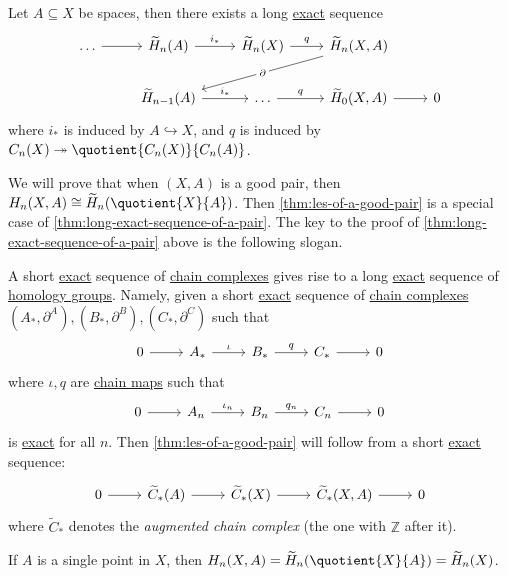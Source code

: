 \begin{theorem}\label{thm:long-exact-sequence-of-a-pair}
	Let \(A \subseteq X\) be spaces, then there exists a long \hyperref[def:exact]{exact} sequence
	\[
		\begin{tikzcd}
			{\ldots} & {\widetilde{H}_n(A)} & {\widetilde{H}_n(X)} & {\widetilde{H}_n(X, A)} \\
			& {\widetilde{H}_{n-1}(A)} & \ldots & {\widetilde{H}_{0}(X, A)} & 0
			\arrow[from=1-1, to=1-2]
			\arrow["{i_\ast}", from=1-2, to=1-3]
			\arrow["q", from=1-3, to=1-4]
			\arrow[from=2-4, to=2-5]
			\arrow["{q}", from=2-3, to=2-4]
			\arrow["{i_\ast}", from=2-2, to=2-3]
			\arrow["{\partial}"{description}, from=1-4, to=2-2]
		\end{tikzcd}
	\]
	where \(i_\ast\) is induced by \(A\hookrightarrow X\), and \(q\) is induced by \(C_{n} (X)\twoheadrightarrow \quotient{C_{n} (X)}{C_{n} (A)}\).
\end{theorem}
We will prove that when \((X, A)\) is a good pair, then \(H_n(X, A) \cong \widetilde{H}_n(\quotient{X}{A})\). Then \autoref{thm:les-of-a-good-pair}
is a special case of \autoref{thm:long-exact-sequence-of-a-pair}. The key to the proof of \autoref{thm:long-exact-sequence-of-a-pair} above is the following slogan.

\begin{remark}
	A short \hyperref[def:exact]{exact} sequence of \hyperref[def:chain-complex]{chain complexes} gives rise to a long \hyperref[def:exact]{exact} sequence
	of \hyperref[def:homology-group]{homology groups}. Namely, given a short \hyperref[def:exact]{exact} sequence of \hyperref[def:chain-complex]{chain complexes}
	\((A_\ast, \partial^A), (B_\ast, \partial^B), (C_\ast, \partial^C)\) such that
	\[\begin{tikzcd}
			0 & {A_\ast} & {B_\ast} & {C_\ast} & 0
			\arrow[from=1-1, to=1-2]
			\arrow["\iota", from=1-2, to=1-3]
			\arrow["q", from=1-3, to=1-4]
			\arrow[from=1-4, to=1-5]
		\end{tikzcd}\]
	where \(\iota , q\) are \hyperref[def:chain-map]{chain maps} such that
	\[\begin{tikzcd}
			0 & {A_n} & {B_n} & {C_n} & 0
			\arrow[from=1-1, to=1-2]
			\arrow["\iota_{n}", from=1-2, to=1-3]
			\arrow["q_{n}", from=1-3, to=1-4]
			\arrow[from=1-4, to=1-5]
		\end{tikzcd}\]
	is \hyperref[def:exact]{exact} for all \(n\).
	Then \autoref{thm:les-of-a-good-pair} will
	follow from a short \hyperref[def:exact]{exact} sequence:
	\[\begin{tikzcd}
			0 & {\widetilde{C}_\ast(A)} & {\widetilde{C}_\ast(X)} & {\widetilde{C}_\ast(X, A)} & 0
			\arrow[from=1-1, to=1-2]
			\arrow[from=1-2, to=1-3]
			\arrow[from=1-3, to=1-4]
			\arrow[from=1-4, to=1-5]
		\end{tikzcd}\]
	where \(\widetilde{C}_\ast\) denotes the \emph{augmented chain complex} (the one with \(\mathbb{Z}\) after it).
\end{remark}

\begin{exercise}
	If \(A\) is a single point in \(X\), then \(H_n(X, A) = \widetilde{H}_n(\quotient{X}{A}) = \widetilde{H}_n(X)\).
\end{exercise}